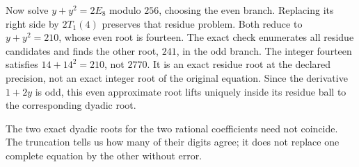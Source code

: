 Now solve $y+y^2=2E_8$ modulo $256$, choosing the even branch. Replacing its right side by $2T_1(4)$ preserves that residue problem. Both reduce to $y+y^2=210$, whose even root is fourteen. The exact check enumerates all residue candidates and finds the other root, $241$, in the odd branch.
The integer fourteen satisfies $14+14^2=210$, not $2770$. It is an exact residue root at the declared precision, not an exact integer root of the original equation. Since the derivative $1+2y$ is odd, this even approximate root lifts uniquely inside its residue ball to the corresponding dyadic root.

The two exact dyadic roots for the two rational coefficients need not coincide. The truncation tells us how many of their digits agree; it does not replace one complete equation by the other without error.

